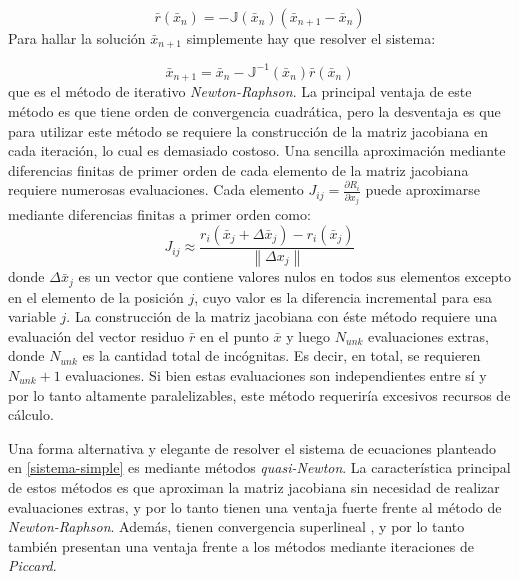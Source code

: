 \begin{equation}
\bar{r}(\bar{x}_n) = -\mathbb{J}(\bar{x}_n)(\bar{x}_{n+1}-\bar{x}_n)
\end{equation}
Para hallar la solución $\bar{x}_{n+1}$ simplemente hay que resolver el sistema:

\begin{equation}
\bar{x}_{n+1} = \bar{x}_{n} -\mathbb{J}^{-1}(\bar{x}_n)\bar{r}(\bar{x}_n)
\end{equation}
que es el método de iterativo \textit{Newton-Raphson}.
La principal ventaja de este método es que tiene orden de convergencia cuadrática,
pero la desventaja es que para utilizar este método se requiere la construcción de la matriz jacobiana en cada iteración, lo cual es demasiado costoso.
Una sencilla aproximación mediante diferencias finitas de primer orden de cada elemento de la matriz jacobiana requiere numerosas evaluaciones.
Cada elemento $J_{ij}=\frac{\partial R_i}{\partial x_j}$ puede aproximarse mediante diferencias finitas a primer orden como:
\begin{equation}
J_{ij} \approx \frac{r_i(\bar{x}_j + \Delta \bar{x}_j) - r_i(\bar{x}_j)}{\left\|\Delta x_j\right\|}
\label{j-diff}
\end{equation}
donde $\Delta \bar{x}_j$ es un vector que contiene valores nulos en todos sus elementos excepto en el elemento de la posición $j$,
cuyo valor es la diferencia incremental para esa variable $j$.
La construcción de la matriz jacobiana con éste método requiere una evaluación del vector residuo $\bar{r}$ en el punto $\bar{x}$ y luego $N_{unk}$ evaluaciones extras,
donde $N_{unk}$ es la cantidad total  de incógnitas. 
Es decir, en total, se requieren $N_{unk}+1$ evaluaciones.
Si bien estas evaluaciones son independientes entre sí y por lo tanto altamente paralelizables, este método requeriría excesivos recursos de cálculo.

Una forma alternativa y elegante de resolver el sistema de ecuaciones planteado en \ref{sistema-simple} es mediante métodos \textit{quasi-Newton}.
La característica principal de estos métodos es que aproximan la matriz jacobiana sin necesidad de realizar evaluaciones extras, y por lo tanto tienen una ventaja fuerte frente al método de \textit{Newton-Raphson}.
Además, tienen convergencia superlineal \cite{broyden-on}, y por lo tanto también presentan una ventaja frente a los métodos mediante iteraciones de \textit{Piccard}. 

